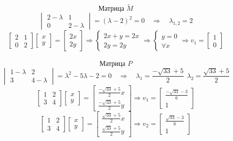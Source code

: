 \documentclass[a3paper,14pt]{extarticle}
\begin{document}
$$\text{Матрица } \tilde{M}$$
$$\begin{vmatrix}
    2-\lambda & 1 \\ 0 & 2-\lambda
\end{vmatrix} = (\lambda - 2)^2 = 0 \quad\Rightarrow\quad \lambda_{1,2}=2$$%
$$\begin{bmatrix}
    2 & 1 \\ 0 & 2
\end{bmatrix}\begin{bmatrix}
    x \\ y
\end{bmatrix} = \begin{bmatrix}
    2x \\ 2y
\end{bmatrix} \Rightarrow \begin{cases}
    2x+y=2x \\
    2y=2y
\end{cases} \Rightarrow \begin{cases}
    y = 0 \\
    \forall x
\end{cases} \Rightarrow v_1 = \begin{bmatrix}
    1 \\ 0
\end{bmatrix}$$\,\\[0.5em]
$$\text{Матрица } P$$
$$\begin{vmatrix}
    1-\lambda & 2 \\ 3 & 4-\lambda
\end{vmatrix} = \lambda^2-5\lambda-2 = 0 \quad\Rightarrow\quad \lambda_1=\frac{-\sqrt{33}+5}{2} \ \ \lambda_2=\frac{\sqrt{33}+5}{2}$$
$$\begin{bmatrix}
    1 & 2 \\ 3 & 4
\end{bmatrix}\begin{bmatrix}
    x \\ y
\end{bmatrix} = \begin{bmatrix}
    \frac{-\sqrt{33}+5}{2}x \\ \frac{-\sqrt{33}+5}{2}y
\end{bmatrix} \Rightarrow v_1 = \begin{bmatrix}
    \frac{-\sqrt{33}-3}{6} \\ 1
\end{bmatrix}$$
$$\begin{bmatrix}
    1 & 2 \\ 3 & 4
\end{bmatrix}\begin{bmatrix}
    x \\ y
\end{bmatrix} = \begin{bmatrix}
    \frac{\sqrt{33}+5}{2}x \\ \frac{\sqrt{33}+5}{2}y
\end{bmatrix} \Rightarrow v_2 = \begin{bmatrix}
    \frac{\sqrt{33}-3}{6} \\ 1
\end{bmatrix}$$\,\\[0.5em]
\end{document}
